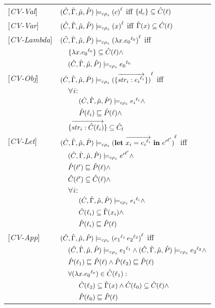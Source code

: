 \documentclass[[12pt,a4paper,twoside,openrigh]{report}
\begin{document}
\begin{tabular}{l l l l}
{[\textit{CV-Val}]}&\multicolumn{3}{l}{$ \ccestl {c} $ iff $\{d_c\} \subseteq \Cat(\ell)$} \\ 
{[\textit{CV-Var}]}&\multicolumn{3}{l}{$ \ccestl {x} $ iff $\Env(x) \subseteq \Cat(\ell)$} \\ 
{[\textit{CV-Lambda}]}&\multicolumn{3}{l}{$ \ccestl {\lam{x}{\lbt 0}} $ iff}\\
&&\multicolumn{2}{l}{$\{\lam{x}{\lbt 0}\} \subseteq \Cat(\ell) \wedge $}\\
&&\multicolumn{2}{l}{$ \ccest {\lbt 0}$}\\
{[\textit{CV-Obj}]}&\multicolumn{3}{l}{$ \ccestl {\rec{\vec{str_i : \lbt i}}}$ iff}\\
&&\multicolumn{2}{l}{$\forall i:$}\\
&&&$\ccest {\lbt i} \wedge$\\
&&&$\Pat(\ell_i) \sqsubseteq \Pat(\ell) \wedge$\\ 
&&\multicolumn{2}{l}{$\rec{\vec{str_i : \Cat(\ell_i)}} \subseteq \Cat_\ell $} \\
{[\textit{CV-Let}]}&\multicolumn{3}{l}{$ \ccestl {\letexprs{x_i}{\lbt i}{{e'}^{\ell'}}}$ iff}\\
&&\multicolumn{2}{l}{$ \ccest {{e'}^{\ell'}} \wedge$} \\
&&\multicolumn{2}{l}{$ \Pat(\ell') \sqsubseteq \Pat(\ell) \wedge$}\\
&&\multicolumn{2}{l}{$ \Cat(\ell') \subseteq \Cat(\ell) \wedge$}\\
&&\multicolumn{2}{l}{$ \forall i:$}\\
&&&$\ccest {{e_i}^{\ell_i}} \wedge$ \\
&&& $ \Cat(\ell_i) \subseteq \Env(x_i) \wedge$ \\
&&& $ \Pat(\ell_i) \sqsubseteq \Pat(\ell) $ \\
{[\textit{CV-App}]}&\multicolumn{3}{l}{$ \ccestl {\appl {\lbt 1} {\lbt 2}}$ iff}\\
&&\multicolumn{2}{l}{$\ccest {\lbt 1} \wedge \ccest {\lbt 2} \wedge$} \\
&&\multicolumn{2}{l}{$\Pat(\ell_1) \sqsubseteq \Pat(\ell) \wedge \Pat(\ell_2) \sqsubseteq \Pat(\ell)$} \\
&&\multicolumn{2}{l}{$\forall (\lam{x}{\lbt 0}) \in \Cat(\ell_1) :$}\\
&&&$\Cat(\ell_2) \subseteq \Env(x) \wedge \Cat(\ell_0) \subseteq \Cat(\ell) \wedge$\\
&&&$\Pat(\ell_0) \sqsubseteq \Pat(\ell) $\\

\end{tabular}
\end{document}

